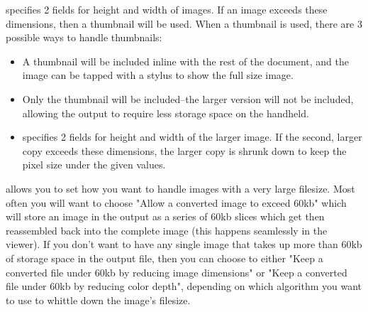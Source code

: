  specifies 2 fields for height and width of images. If an image 
exceeds these dimensions, then a thumbnail will be used. When a thumbnail is 
used, there are 3 possible ways to handle thumbnails:

\begin{itemize}
  \item {} 
  A thumbnail will be included inline with the rest of the document, and the 
  image can be tapped with a stylus to show the full size image. 

  \item {} Only the thumbnail will be included--the 
  larger version will not be included, allowing the output to require less 
  storage space on the handheld.

  \item {} specifies 2 fields for height and 
  width of the larger image. If the second, larger copy exceeds these dimensions, 
  the larger copy is shrunk down to keep the pixel size under the given values.
\end{itemize}

allows you to set how you want to handle images with a very large filesize.
Most often you will want to choose "Allow a converted image to exceed 60kb"
which will store an image in the output as a series of 60kb slices which 
get then reassembled back into the complete image 
(this happens seamlessly in the viewer).
If you don't want to have any single image that takes up more than 60kb of
storage space in the output file, then you can choose to either 
"Keep a converted file under 60kb by reducing image dimensions" or 
"Keep a converted file under 60kb by reducing color depth", depending on 
which algorithm you want to use to whittle down the image's filesize.


